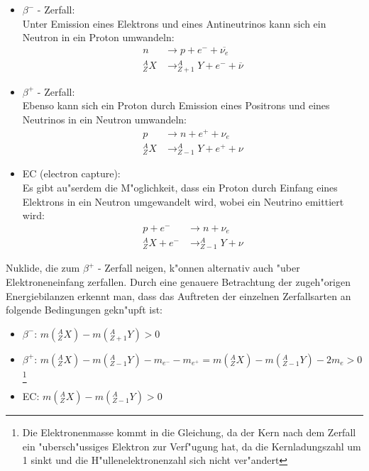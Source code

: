 \documentclass{article}
\begin{document}
\begin{itemize}
\item{$\beta^-$ - Zerfall:\\
Unter Emission eines Elektrons und eines Antineutrinos kann sich ein Neutron in ein Proton umwandeln:
\begin{equation}
\begin{split}
n &\rightarrow p + e^- + \overline{\nu_e}\\
^A_Z X &\rightarrow ^A_{Z+1}Y + e^- + \overline{\nu}
\end{split}
\end{equation}}
\item{$\beta^+$ - Zerfall:\\
Ebenso kann sich ein Proton durch Emission eines Positrons und eines Neutrinos in ein Neutron umwandeln:
\begin{equation}
\begin{split}
p &\rightarrow n + e^+ + \nu_e\\
^A_Z X &\rightarrow ^A_{Z-1}Y + e^+ + \nu
\end{split}
\end{equation}}
\item{EC (electron capture):\\
Es gibt au"serdem die M"oglichkeit, dass ein Proton durch Einfang eines Elektrons in ein Neutron umgewandelt wird, wobei ein Neutrino emittiert wird:
\begin{equation}
\begin{split}
p + e^- &\rightarrow n + \nu_e\\
^A_Z X + e^- &\rightarrow ^A_{Z-1}Y + \nu
\end{split}
\end{equation}}
\end{itemize}


Nuklide, die zum $\beta^+$ - Zerfall neigen, k"onnen alternativ auch "uber Elektroneneinfang zerfallen. Durch eine genauere Betrachtung der zugeh"origen Energiebilanzen erkennt man, dass das Auftreten der einzelnen Zerfallsarten an folgende Bedingungen gekn"upft ist:

\begin{itemize}
\item{$\beta^-$: $m(^A_Z X) - m(^A_{Z+1}Y) > 0$}
\item{$\beta^+$: $m(^A_Z X) - m(^A_{Z-1}Y) - m_{e^-} - m_{e^+} = m(^A_Z X) - m(^A_{Z-1}Y) - 2m_e > 0$}\footnote{Die Elektronenmasse kommt in die Gleichung, da der Kern nach dem Zerfall ein "ubersch"ussiges Elektron zur Verf"ugung hat, da die Kernladungszahl um 1 sinkt und die H"ullenelektronenzahl sich nicht ver"andert}
\item{EC: $m(^A_Z X) - m(^A_{Z-1}Y) > 0$}
\end{itemize}
\end{document}
